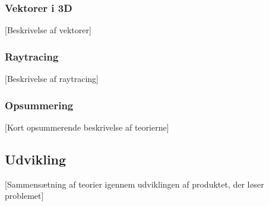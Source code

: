 \subsubsection{Vektorer i 3D}

[Beskrivelse af vektorer]

\subsubsection{Raytracing}

[Beskrivelse af raytracing]

\subsubsection*{Opsummering}

[Kort opsummerende beskrivelse af teorierne]

\subsection{Udvikling}

[Sammensætning af teorier igennem udviklingen af produktet, der løser problemet]

\clearpage
